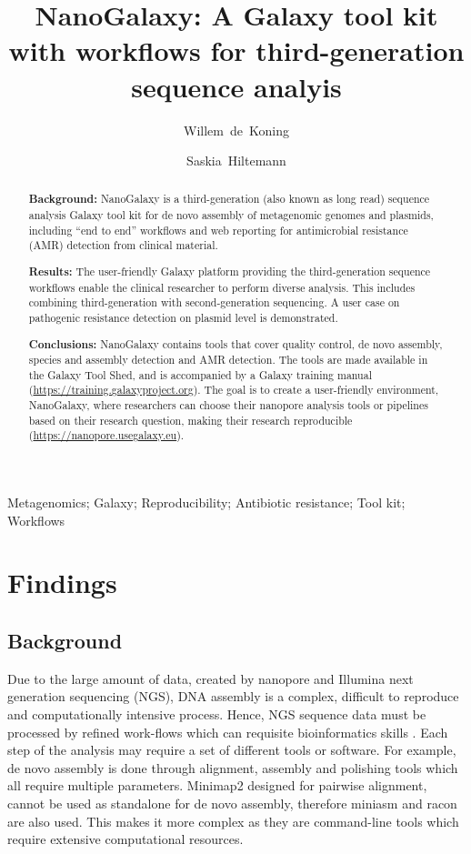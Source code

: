 \documentclass[a4paper,num-refs]{oup-contemporary}
\title{NanoGalaxy: A Galaxy tool kit with workflows for third-generation sequence analyis}
\author[1,\authfn{1}]{Willem~de~Koning}
\author[1]{Saskia~Hiltemann}
\affil[1]{Erasmus Medical Center, Department of Pathology, Wytemaweg 80, 3015 CN, Rotterdam, The Netherlands}
\affil[2]{Bioinformatics Group, Department of Computer Science, University of Freiburg, 79110 Freiburg im Breisgau, Germany}
\begin{document}
\begin{frontmatter}
\maketitle
\begin{abstract}

\textbf{Background:} NanoGalaxy is a third-generation (also known as long read) sequence analysis Galaxy tool kit for de novo assembly of metagenomic genomes and plasmids, including “end to end” workflows and web reporting for antimicrobial resistance (AMR) detection from clinical material.

\textbf{Results:} The user-friendly Galaxy platform providing the third-generation sequence workflows enable the clinical researcher to perform diverse analysis. This includes combining third-generation with second-generation sequencing. A user case on pathogenic resistance detection on plasmid level is demonstrated. 

\textbf{Conclusions:} NanoGalaxy contains tools that cover quality control, de novo assembly, species and assembly detection and AMR detection. The tools are made available in the Galaxy Tool Shed, and is accompanied by a Galaxy training manual (\url{https://training.galaxyproject.org}). The goal is to create a user-friendly environment, NanoGalaxy, where researchers can choose their nanopore analysis tools or pipelines based on their research question, making their research reproducible (\url{https://nanopore.usegalaxy.eu}). 
\end{abstract}

\begin{keywords}
Metagenomics; Galaxy; Reproducibility; Antibiotic resistance; Tool kit; Workflows
\end{keywords}
\end{frontmatter}

\section{Findings}
\subsection{Background}
Due to the large amount of data, created by nanopore and Illumina next generation sequencing (NGS), DNA assembly is a complex, difficult to reproduce and computationally intensive process. Hence, NGS sequence data must be processed by refined work-flows which can requisite bioinformatics skills \cite{Hemlata2016}. Each step of the analysis may require a set of different tools or software. For example, de novo assembly is done through alignment, assembly and polishing tools which all require multiple parameters. Minimap2 designed for pairwise alignment, cannot be used as standalone for de novo assembly, therefore miniasm and racon are also used. This makes it more complex as they are command-line tools which require extensive computational resources. 
\end{document}
